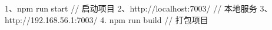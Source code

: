 
1、npm run start   // 启动项目
2、http://localhost:7003/   // 本地服务
3、http://192.168.56.1:7003/
4. npm run build    // 打包项目